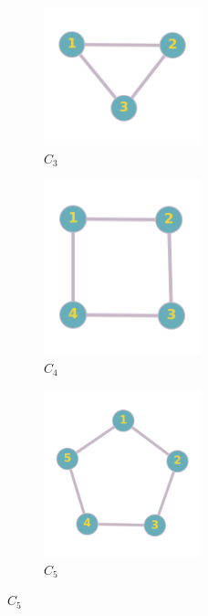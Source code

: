 \documentclass[a4paper,1pt]{report}
\begin{document}
\begin{figure}[H]
    \centering
    \begin{subfigure}[b]{0.30\textwidth}
    \centering
    \includegraphics[width=0.5\textwidth]{figures2/C3.png}
    \caption{$C_3$}
    \end{subfigure}
    \begin{subfigure}[b]{0.30\textwidth}
        \centering
    \includegraphics[width=0.5\textwidth]{figures2/C4.png}
    \caption{$C_4$}
    \end{subfigure}
    \begin{subfigure}[b]{0.30\textwidth}
        \centering
    \includegraphics[width=0.5\textwidth]{figures2/C5.png}
    \caption{$C_5$}
    \end{subfigure}
\end{figure} 
\end{document}
